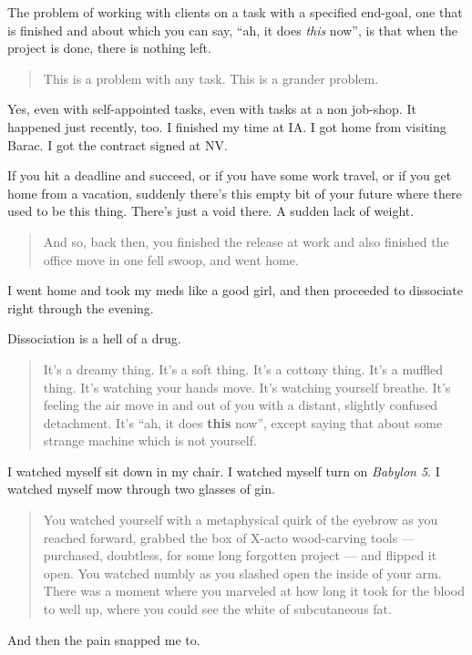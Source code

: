 The problem of working with clients on a task with a specified end-goal, one that is finished and about which you can say, ``ah, it does \emph{this} now'', is that when the project is done, there is nothing left.

\begin{quote}
This is a problem with any task. This is a grander problem.
\end{quote}

Yes, even with self-appointed tasks, even with tasks at a non job-shop. It happened just recently, too. I finished my time at IA. I got home from visiting Barac. I got the contract signed at NV.

If you hit a deadline and succeed, or if you have some work travel, or if you get home from a vacation, suddenly there's this empty bit of your future where there used to be this thing. There's just a void there. A sudden lack of weight.

\begin{quote}
And so, back then, you finished the release at work and also finished the office move in one fell swoop, and went home.
\end{quote}

I went home and took my meds like a good girl, and then proceeded to dissociate right through the evening.

Dissociation is a hell of a drug.

\begin{quote}
It's a dreamy thing. It's a soft thing. It's a cottony thing. It's a muffled thing. It's watching your hands move. It's watching yourself breathe. It's feeling the air move in and out of you with a distant, slightly confused detachment. It's ``ah, it does \textbf{this} now'', except saying that about some strange machine which is not yourself.
\end{quote}

I watched myself sit down in my chair. I watched myself turn on \emph{Babylon 5}. I watched myself mow through two glasses of gin.

\begin{quote}
You watched yourself with a metaphysical quirk of the eyebrow as you reached forward, grabbed the box of X-acto wood-carving tools --- purchased, doubtless, for some long forgotten project --- and flipped it open. You watched numbly as you slashed open the inside of your arm. There was a moment where you marveled at how long it took for the blood to well up, where you could see the white of subcutaneous fat.
\end{quote}

And then the pain snapped me to.
